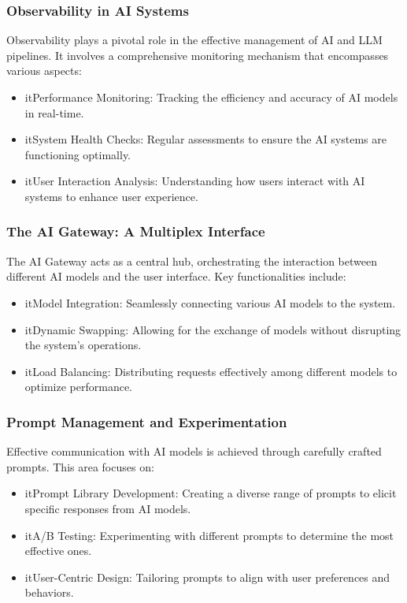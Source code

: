 \subsubsection{Observability in AI Systems}
Observability plays a pivotal role in the effective management of AI and LLM pipelines. It involves a comprehensive monitoring mechanism that encompasses various aspects:
\begin{itemize}
    \item it{Performance Monitoring:} Tracking the efficiency and accuracy of AI models in real-time.
    \item it{System Health Checks:} Regular assessments to ensure the AI systems are functioning optimally.
    \item it{User Interaction Analysis:} Understanding how users interact with AI systems to enhance user experience.
\end{itemize}

\subsubsection{The AI Gateway: A Multiplex Interface}
The AI Gateway acts as a central hub, orchestrating the interaction between different AI models and the user interface. Key functionalities include:
\begin{itemize}
    \item it{Model Integration:} Seamlessly connecting various AI models to the system.
    \item it{Dynamic Swapping:} Allowing for the exchange of models without disrupting the system’s operations.
    \item it{Load Balancing:} Distributing requests effectively among different models to optimize performance.
\end{itemize}

\subsubsection{Prompt Management and Experimentation}
Effective communication with AI models is achieved through carefully crafted prompts. This area focuses on:
\begin{itemize}
    \item it{Prompt Library Development:} Creating a diverse range of prompts to elicit specific responses from AI models.
    \item it{A/B Testing:} Experimenting with different prompts to determine the most effective ones.
    \item it{User-Centric Design:} Tailoring prompts to align with user preferences and behaviors.
\end{itemize}

